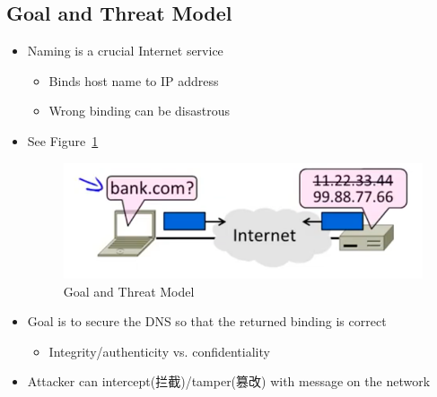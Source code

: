 \documentclass[12pt]{ctexart}   %
\begin{document}
	\subsection{Goal and Threat Model}
	\begin{itemize}
		\item Naming is a crucial Internet service
		\begin{itemize}
			\item Binds host name to IP address
			\item Wrong binding can be disastrous
		\end{itemize}
		\item See Figure~\ref{fig:10-6-2}
		  
		\begin{figure}[h!] %
		\centering
		\includegraphics[scale=0.7]{images/10-6-2}
		\caption{Goal and Threat Model}
		\label{fig:10-6-2}
		\end{figure}

		\item Goal is to secure the DNS so that the returned binding is correct
		\begin{itemize}
			\item Integrity/authenticity vs. confidentiality
		\end{itemize}

		\item Attacker can intercept(拦截)/tamper(篡改) with message on the network
	\end{itemize}
\end{document}
